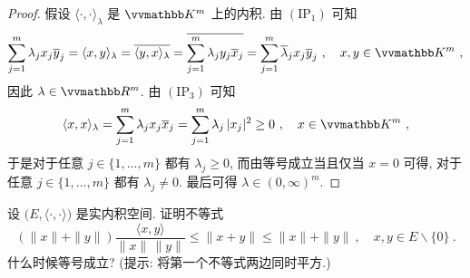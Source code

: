 \begin{proof}
    假设 \(\langle \cdot, \cdot \rangle_\lambda\) 是 \(\K^m\) 上的内积. 由 \((\mathrm{IP}_1)\) 可知
    \[
        \sum_{j = 1}^m \lambda_j x_j \overline y_j = \langle x, y \rangle_\lambda = \overline{\langle y, x \rangle_\lambda} = \overline{\sum_{j = 1}^m \lambda_j y_j \overline x_j} = \sum_{j = 1}^m \overline \lambda_j x_j \overline y_j\ ,\quad x, y \in \K^m\ ,
    \]
    因此 \(\lambda \in \R^m\). 由 \((\mathrm{IP}_3)\) 可知
    \[
        \langle x, x \rangle_\lambda = \sum_{j = 1}^m \lambda_j x_j \overline x_j = \sum_{j = 1}^m \lambda_j\, |x_j|^2 \geq 0\ ,\quad x \in \K^m\ ,
    \]
    于是对于任意 \(j \in \{1, \ldots, m\}\) 都有 \(\lambda_j \geq 0\), 而由等号成立当且仅当 \(x = 0\) 可得, 对于任意 \(j \in \{1, \ldots, m\}\) 都有 \(\lambda_j \neq 0\). 最后可得 \(\lambda \in (0, \infty)^m\).
\end{proof}

\begin{exercise}
    设 \(\bigl(E, \langle \cdot, \cdot \rangle\bigr)\) 是实内积空间. 证明不等式
    \[
        (\|x\| + \|y\|) \frac{\langle x, y \rangle}{\|x\|\, \|y\|} \leq \|x + y\| \leq \|x\| + \|y\|\ ,\quad x, y \in E \backslash \{0\}\ .
    \]
    什么时候等号成立? (提示: 将第一个不等式两边同时平方.)
\end{exercise}

